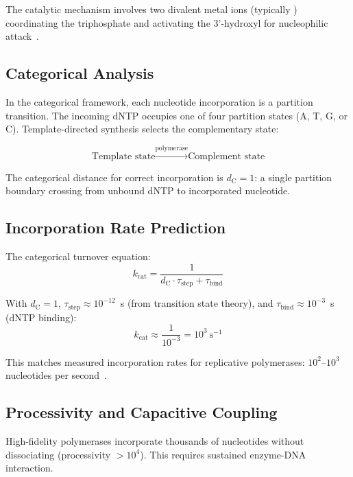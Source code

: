 \documentclass[twocolumn,aps,prb,superscriptaddress,longbibliography,floatfix]{revtex4-2}
\theoremstyle{remark}
\newcommand{\dC}{d_\text{C}}
\begin{document}
The catalytic mechanism involves two divalent metal ions (typically
) coordinating the triphosphate and activating the
3'-hydroxyl for nucleophilic attack~\cite{Steitz1998}.

\subsection{Categorical Analysis}

In the categorical framework, each nucleotide incorporation is a
partition transition. The incoming dNTP occupies one of four partition
states (A, T, G, or C). Template-directed synthesis selects the
complementary state:

\begin{equation}
\text{Template state} \xrightarrow{\text{polymerase}} \text{Complement state}
\end{equation}

The categorical distance for correct incorporation is $\dC = 1$: a
single partition boundary crossing from unbound dNTP to incorporated
nucleotide.

\subsection{Incorporation Rate Prediction}

The categorical turnover equation:
\begin{equation}
k_\text{cat} = \frac{1}{\dC \cdot \tau_\text{step} + \tau_\text{bind}}
\label{eq:polymerase_rate}
\end{equation}

With $\dC = 1$, $\tau_\text{step} \approx 10^{-12}$~s (from transition
state theory), and $\tau_\text{bind} \approx 10^{-3}$~s (dNTP binding):
\begin{equation}
k_\text{cat} \approx \frac{1}{10^{-3}} = 10^3~\text{s}^{-1}
\end{equation}

This matches measured incorporation rates for replicative polymerases:
$10^2$--$10^3$ nucleotides per second~\cite{Johnson2010}.

\subsection{Processivity and Capacitive Coupling}

High-fidelity polymerases incorporate thousands of nucleotides without
dissociating (processivity $>10^4$). This requires sustained
enzyme-DNA interaction.
\end{document}
